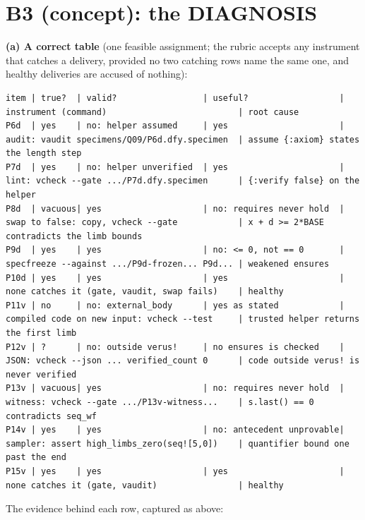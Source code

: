 \documentclass[11pt]{article}
\begin{document}
\section*{B3 (concept): the DIAGNOSIS}

\textbf{(a) A correct table} (one feasible assignment; the rubric accepts any
instrument that catches a delivery, provided no two catching rows name the
same one, and healthy deliveries are accused of nothing):
\begin{lstlisting}[basicstyle=\ttfamily\scriptsize,breaklines=true,columns=fullflexible]
item | true?  | valid?                 | useful?                  | instrument (command)                          | root cause
P6d  | yes    | no: helper assumed     | yes                      | audit: vaudit specimens/Q09/P6d.dfy.specimen  | assume {:axiom} states the length step
P7d  | yes    | no: helper unverified  | yes                      | lint: vcheck --gate .../P7d.dfy.specimen      | {:verify false} on the helper
P8d  | vacuous| yes                    | no: requires never hold  | swap to false: copy, vcheck --gate            | x + d >= 2*BASE contradicts the limb bounds
P9d  | yes    | yes                    | no: <= 0, not == 0       | specfreeze --against .../P9d-frozen... P9d... | weakened ensures
P10d | yes    | yes                    | yes                      | none catches it (gate, vaudit, swap fails)    | healthy
P11v | no     | no: external_body      | yes as stated            | compiled code on new input: vcheck --test     | trusted helper returns the first limb
P12v | ?      | no: outside verus!     | no ensures is checked    | JSON: vcheck --json ... verified_count 0      | code outside verus! is never verified
P13v | vacuous| yes                    | no: requires never hold  | witness: vcheck --gate .../P13v-witness...    | s.last() == 0 contradicts seq_wf
P14v | yes    | yes                    | no: antecedent unprovable| sampler: assert high_limbs_zero(seq![5,0])    | quantifier bound one past the end
P15v | yes    | yes                    | yes                      | none catches it (gate, vaudit)                | healthy
\end{lstlisting}
The evidence behind each row, captured as above:
\end{document}
